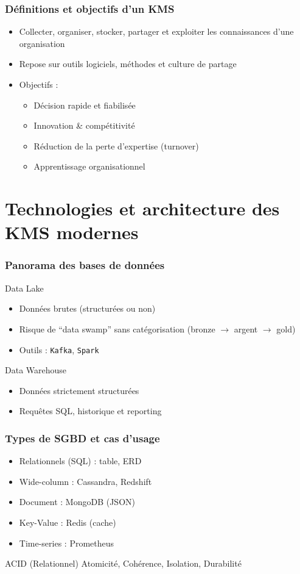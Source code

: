 \documentclass{beamer}
\begin{document}
\begin{frame}
  \frametitle{Définitions et objectifs d’un KMS}
  \begin{itemize}
    \item Collecter, organiser, stocker, partager et exploiter les connaissances d’une organisation
    \item Repose sur outils logiciels, méthodes et culture de partage
    \item Objectifs :
      \begin{itemize}
        \item Décision rapide et fiabilisée
        \item Innovation & compétitivité
        \item Réduction de la perte d’expertise (turnover)
        \item Apprentissage organisationnel
      \end{itemize}
  \end{itemize}
\end{frame}

\section{Technologies et architecture des KMS modernes}

\begin{frame}
  \frametitle{Panorama des bases de données}
  \begin{block}{Data Lake}
    \begin{itemize}
      \item Données brutes (structurées ou non)
      \item Risque de “data swamp” sans catégorisation (bronze $\to$ argent $\to$ gold)
      \item Outils : \texttt{Kafka}, \texttt{Spark}
    \end{itemize}
  \end{block}
  \begin{block}{Data Warehouse}
    \begin{itemize}
      \item Données strictement structurées
      \item Requêtes SQL, historique et reporting
    \end{itemize}
  \end{block}
\end{frame}

\begin{frame}
  \frametitle{Types de SGBD et cas d'usage}
  \begin{itemize}
    \item Relationnels (SQL) : table, ERD
    \item Wide-column : Cassandra, Redshift
    \item Document : MongoDB (JSON)
    \item Key-Value : Redis (cache)
    \item Time-series : Prometheus
  \end{itemize}
  \begin{block}{ACID (Relationnel)}
    Atomicité, Cohérence, Isolation, Durabilité
  \end{block}
\end{frame}
\end{document}
